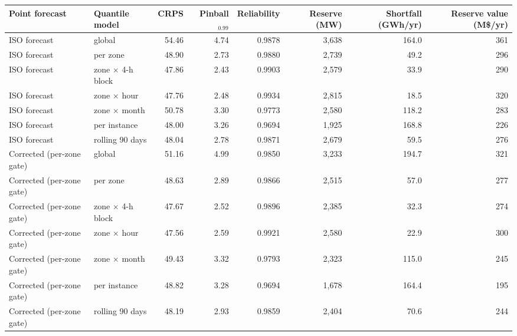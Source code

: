 \begin{tabular}{@{}l l r r r r r r@{}}\toprule
Point forecast & Quantile model & CRPS & Pinball$_{0.99}$ & Reliability & Reserve (MW) & Shortfall (GWh/yr) & Reserve value (M\$/yr) \\\midrule
ISO forecast & global & 54.46 & 4.74 & 0.9878 & 3,638 & 164.0 & 361 \\
ISO forecast & per zone & 48.90 & 2.73 & 0.9880 & 2,739 & 49.2 & 296 \\
ISO forecast & zone $\times$ 4-h block & 47.86 & 2.43 & 0.9903 & 2,579 & 33.9 & 290 \\
ISO forecast & zone $\times$ hour & 47.76 & 2.48 & 0.9934 & 2,815 & 18.5 & 320 \\
ISO forecast & zone $\times$ month & 50.78 & 3.30 & 0.9773 & 2,580 & 118.2 & 283 \\
ISO forecast & per instance & 48.00 & 3.26 & 0.9694 & 1,925 & 168.8 & 226 \\
ISO forecast & rolling 90 days & 48.04 & 2.78 & 0.9871 & 2,679 & 59.5 & 276 \\
\midrule
Corrected (per-zone gate) & global & 51.16 & 4.99 & 0.9850 & 3,233 & 194.7 & 321 \\
Corrected (per-zone gate) & per zone & 48.63 & 2.89 & 0.9866 & 2,515 & 57.0 & 277 \\
Corrected (per-zone gate) & zone $\times$ 4-h block & 47.67 & 2.52 & 0.9896 & 2,385 & 32.3 & 274 \\
Corrected (per-zone gate) & zone $\times$ hour & 47.56 & 2.59 & 0.9921 & 2,580 & 22.9 & 300 \\
Corrected (per-zone gate) & zone $\times$ month & 49.43 & 3.32 & 0.9793 & 2,323 & 115.0 & 245 \\
Corrected (per-zone gate) & per instance & 48.82 & 3.28 & 0.9694 & 1,678 & 164.4 & 195 \\
Corrected (per-zone gate) & rolling 90 days & 48.19 & 2.93 & 0.9859 & 2,404 & 70.6 & 244 \\
\bottomrule\end{tabular}
